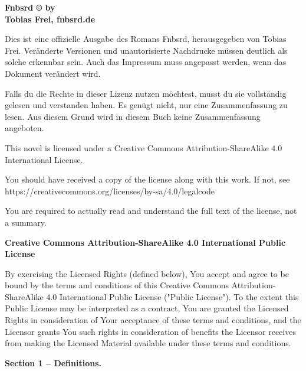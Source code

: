 \textbf{Fnbsrd © by\\ Tobias Frei, fnbsrd.de}

Dies ist eine offizielle Ausgabe des Romans Fnbsrd, herausgegeben von Tobias Frei. Veränderte Versionen und unautorisierte Nachdrucke müssen deutlich als solche erkennbar sein. Auch das Impressum muss angepasst werden, wenn das Dokument verändert wird.

Falls du die Rechte in dieser Lizenz nutzen möchtest, musst du sie vollständig gelesen und verstanden haben. Es genügt nicht, nur eine Zusammenfassung zu lesen. Aus diesem Grund wird in diesem Buch keine Zusammenfassung angeboten.

This novel is licensed under a Creative Commons Attribution-ShareAlike 4.0 International License.

You should have received a copy of the license along with this work. If not, see\\
https://creativecommons.org/licenses/by-sa/4.0/legalcode

You are required to actually read and understand the full text of the license, not a summary.

\begin{center}
    \large{\textbf{Creative Commons Attribution-ShareAlike 4.0 International Public License}}
\end{center}

By exercising the Licensed Rights (defined below), You accept and agree to be bound by the terms and conditions of this Creative Commons Attribution-ShareAlike 4.0 International Public License ("Public License"). To the extent this Public License may be interpreted as a contract, You are granted the Licensed Rights in consideration of Your acceptance of these terms and conditions, and the Licensor grants You such rights in consideration of benefits the Licensor receives from making the Licensed Material available under these terms and conditions.

\begin{center}
    \textbf{Section 1 -- Definitions.}
\end{center}

